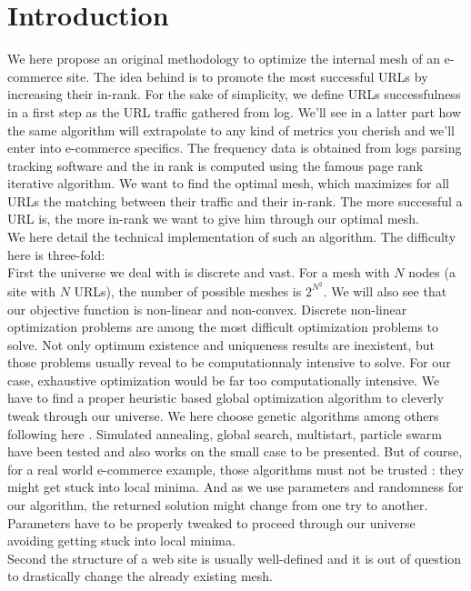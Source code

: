 \documentclass{iSWAGArticle}
\begin{document}
\section{Introduction}
We here propose an original methodology to optimize the internal mesh of an e-commerce site.
The idea behind is to promote the most successful URLs by increasing their in-rank.  
For the sake of simplicity, we define URLs successfulness in a first step as the URL traffic gathered from log.
We'll see in a latter part how the same algorithm will extrapolate to any kind of metrics you cherish and we'll enter into e-commerce specifics.
The frequency data is obtained from logs parsing tracking software and the in rank is computed using the famous page rank iterative algorithm.  
We want to find the optimal mesh, which maximizes for all URLs the matching between their traffic and their in-rank. 
The more successful a URL is, the more in-rank we want to give him through our optimal mesh.
 \\\newline
We here detail the technical implementation of such an algorithm.
The difficulty here is three-fold:
\\
\indent
First the universe we deal with is discrete and vast. For a mesh with $N$ nodes (a site with $N$ URLs), the number of possible meshes is $2^{N^{2}}$. 
We will also see that our objective function is non-linear and non-convex.  Discrete non-linear optimization problems are among the most difficult optimization problems to solve. 
Not only optimum existence and uniqueness results are inexistent, but those problems usually reveal to be computationnaly intensive to solve. 
For our case, exhaustive optimization would be far too computationally intensive. We have to find a proper heuristic based global optimization algorithm to cleverly tweak through our universe.
We here choose genetic algorithms among others following here \cite{gen_algo_web}. Simulated annealing, global search, multistart, particle swarm have been tested and also works on the small case to be presented.
But of course, for a real world e-commerce example, those algorithms must not be trusted : they might get stuck into local minima. 
And as we use parameters and randomness for our algorithm, the returned solution might change from one try to another. 
Parameters have to be properly tweaked to proceed through our universe avoiding getting stuck into local minima.
\\
\indent
Second the structure of a web site is usually well-defined and it is out of question to drastically change the already existing mesh.
\end{document}
